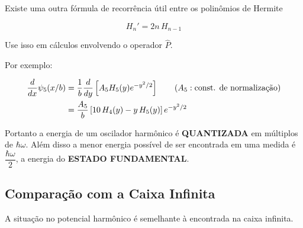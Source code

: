 Existe uma outra fórmula de recorrência útil entre os polinômios de Hermite

\begin{equation}
    \boxed{H_n' = 2n\,H_{n-1}}
\label{eq:aula16_hermite_derivada}
\end{equation}

Use isso em cálculos envolvendo o operador $\hat{P}$.

Por exemplo:

\begin{align}
    \frac{d}{dx}\psi_5(x/b) &= \frac{1}{b}\frac{d}{dy}\left[ A_5 H_5(y) e^{-y^2/2} \right] \qquad (A_5: \text{const. de normalização}) \notag \\
    &= \frac{A_5}{b}\left[ 10\,H_4(y) - y\,H_5(y) \right] e^{-y^2/2}
\label{eq:aula16_exemplo_derivada_hermite}
\end{align}

Portanto a energia de um oscilador harmônico é \textbf{QUANTIZADA} em múltiplos de $\hbar\omega$. Além disso a menor energia possível de ser encontrada em uma medida é $\dfrac{\hbar\omega}{2}$, a energia do \textbf{ESTADO FUNDAMENTAL}.

\subsection*{Comparação com a Caixa Infinita}

A situação no potencial harmônico é semelhante à encontrada na caixa infinita.

